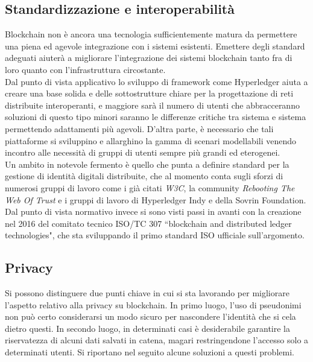     \subsection{Standardizzazione e interoperabilità}
        Blockchain non è ancora una tecnologia sufficientemente matura da permettere una piena ed agevole integrazione con i sistemi esistenti. Emettere degli standard adeguati aiuterà a migliorare l'integrazione dei sistemi blockchain tanto fra di loro quanto con l'infrastruttura circostante. \\
        Dal punto di vista applicativo lo sviluppo di framework come Hyperledger aiuta a creare una base solida e delle sottostrutture chiare per la progettazione di reti distribuite interoperanti, e maggiore sarà il numero di utenti che abbracceranno soluzioni di questo tipo minori saranno le differenze critiche tra sistema e sistema permettendo adattamenti più agevoli. D'altra parte, è necessario che tali piattaforme si sviluppino e allarghino la gamma di scenari modellabili venendo incontro alle necessità di gruppi di utenti sempre più grandi ed eterogenei. \\
        Un ambito in notevole fermento è quello che punta a definire standard per la gestione di identità digitali distribuite, che al momento conta sugli sforzi di numerosi gruppi di lavoro come i già citati \emph{W3C}, la community \emph{Rebooting The Web Of Trust} \cite{rebooting_web_of_trust} e i gruppi di lavoro di Hyperledger Indy e della Sovrin Foundation. \\
        Dal punto di vista normativo invece si sono visti passi in avanti con la creazione nel 2016 del comitato tecnico ISO/TC 307 ``blockchain and distributed ledger technologies", che sta sviluppando il primo standard ISO ufficiale sull'argomento.

    \subsection{Privacy}
        Si possono distinguere due punti chiave in cui si sta lavorando per migliorare l'aspetto relativo alla privacy su blockchain. In primo luogo, l'uso di pseudonimi non può certo considerarsi un modo sicuro per nascondere l'identità che si cela dietro questi. In secondo luogo, in determinati casi è desiderabile garantire la riservatezza di alcuni dati salvati in catena, magari restringendone l'accesso solo a determinati utenti. Si riportano nel seguito alcune soluzioni a questi problemi.
        

